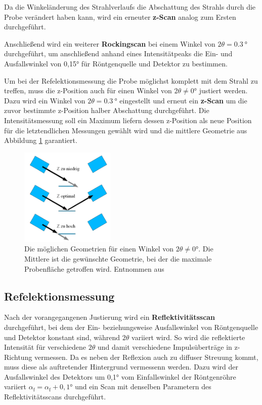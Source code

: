         Da die Winkeländerung des Strahlverlaufs die Abschattung des Strahls durch die Probe verändert haben kann, wird ein erneuter \textbf{z-Scan} analog zum Ersten durchgeführt. 

        Anschließend wird ein weiterer \textbf{Rockingscan} bei einem Winkel von $2\theta = \SI{0.3}{\degree}$ durchgeführt, um anschließend anhand eines Intensitätpeaks die Ein- und Ausfallswinkel von 0,15°
        für Röntgenquelle und Detektor zu bestimmen. 

        Um bei der Refelektionsmessung die Probe möglichst komplett mit dem Strahl zu treffen, muss die z-Position auch für einen Winkel von $2\theta\neq0°$ justiert werden. Dazu wird ein Winkel von
        $2\theta = \SI{0.3}{\degree}$ eingestellt und erneut ein \textbf{z-Scan} um die zuvor bestimmte z-Position halber Abschattung durchgeführt. Die Intensitätsmessung soll ein Maximum liefern dessen 
        z-Position als neue Position für die letztendlichen Messungen gewählt wird und die mittlere Geometrie aus Abbildung \ref{fig:zScan_Winkel} garantiert.

        \FloatBarrier
        \begin{figure}[h]
            \centering
            \includegraphics[width = 0.4\textwidth]{pictures/zScan_winkel.png}
            \caption{Die möglichen Geometrien für einen Winkel von $2\theta\neq0°$. Die Mittlere ist die gewünschte Geometrie, bei der die maximale Probenfläche getroffen wird. Entnommen aus \cite{tu_dortmund_versuchsanleitung_2022}}
            \label{fig:zScan_Winkel}
          \end{figure}
      
        \FloatBarrier
        
 
    \subsection{Refelektionsmessung}
        Nach der vorangegangenen Justierung wird ein \textbf{Reflektivitätsscan} durchgeführt, bei dem der Ein- beziehungsweise Ausfallswinkel von Röntgenquelle und Detektor konstant sind, während $2\theta$
        variiert wird. So wird die reflektierte Intensität für verschiedene $2\theta$ und damit verschiedene Impulsüberträge in z-Richtung vermessen. Da es neben der Reflexion auch zu diffuser Streuung kommt,
        muss diese als auftretender Hintergrund vermessenn werden. Dazu wird der Ausfallswinkel des Detektors um 0,1° vom Einfallswinkel der Röntgenröhre variiert $\alpha_{\text{f}} = \alpha_{\text{f}} + 0,1°$
        und ein Scan mit denselben Parametern des Reflektivitätsscans durchgeführt.
    \newpage
